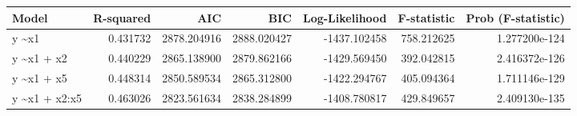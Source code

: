 \begin{tabular}{lrrrrrr}
\toprule
          Model &  R-squared &          AIC &          BIC &  Log-Likelihood &  F-statistic &  Prob (F-statistic) \\
\midrule
         y \textasciitilde  x1 &   0.431732 &  2878.204916 &  2888.020427 &    -1437.102458 &   758.212625 &       1.277200e-124 \\
    y \textasciitilde  x1 + x2 &   0.440229 &  2865.138900 &  2879.862166 &    -1429.569450 &   392.042815 &       2.416372e-126 \\
    y \textasciitilde  x1 + x5 &   0.448314 &  2850.589534 &  2865.312800 &    -1422.294767 &   405.094364 &       1.711146e-129 \\
 y \textasciitilde  x1 + x2:x5 &   0.463026 &  2823.561634 &  2838.284899 &    -1408.780817 &   429.849657 &       2.409130e-135 \\
\bottomrule
\end{tabular}
